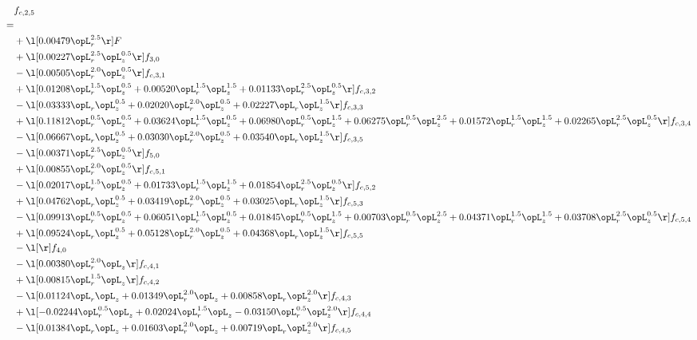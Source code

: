 \begin{alignat}{2} 
\label{eq:f_25_2} 
& f_{c,2,5} \nonumber \\ 
 = \\ 
& + \l[  0.00479 \opL_r^{2.5}  \r] F \nonumber \\ 
& + \l[  0.00227 \opL_r^{2.5} \opL_z^{0.5}  \r] f_{3,0} \nonumber \\ 
& - \l[  0.00505 \opL_r^{2.0} \opL_z^{0.5}  \r] f_{c,3,1} \nonumber \\ 
& + \l[  0.01208 \opL_r^{1.5} \opL_z^{0.5} +  0.00520 \opL_r^{1.5} \opL_z^{1.5} +  0.01133 \opL_r^{2.5} \opL_z^{0.5}  \r] f_{c,3,2} \nonumber \\ 
& - \l[  0.03333 \opL_r \opL_z^{0.5} +  0.02020 \opL_r^{2.0} \opL_z^{0.5} +  0.02227 \opL_r \opL_z^{1.5}  \r] f_{c,3,3} \nonumber \\ 
& + \l[  0.11812 \opL_r^{0.5} \opL_z^{0.5} +  0.03624 \opL_r^{1.5} \opL_z^{0.5} +  0.06980 \opL_r^{0.5} \opL_z^{1.5} +  0.06275 \opL_r^{0.5} \opL_z^{2.5} +  0.01572 \opL_r^{1.5} \opL_z^{1.5} +  0.02265 \opL_r^{2.5} \opL_z^{0.5}  \r] f_{c,3,4} \nonumber \\ 
& - \l[  0.06667 \opL_r \opL_z^{0.5} +  0.03030 \opL_r^{2.0} \opL_z^{0.5} +  0.03540 \opL_r \opL_z^{1.5}  \r] f_{c,3,5} \nonumber \\ 
& - \l[  0.00371 \opL_r^{2.5} \opL_z^{0.5}  \r] f_{5,0} \nonumber \\ 
& + \l[  0.00855 \opL_r^{2.0} \opL_z^{0.5}  \r] f_{c,5,1} \nonumber \\ 
& - \l[  0.02017 \opL_r^{1.5} \opL_z^{0.5} +  0.01733 \opL_r^{1.5} \opL_z^{1.5} +  0.01854 \opL_r^{2.5} \opL_z^{0.5}  \r] f_{c,5,2} \nonumber \\ 
& + \l[  0.04762 \opL_r \opL_z^{0.5} +  0.03419 \opL_r^{2.0} \opL_z^{0.5} +  0.03025 \opL_r \opL_z^{1.5}  \r] f_{c,5,3} \nonumber \\ 
& - \l[  0.09913 \opL_r^{0.5} \opL_z^{0.5} +  0.06051 \opL_r^{1.5} \opL_z^{0.5} +  0.01845 \opL_r^{0.5} \opL_z^{1.5} +  0.00703 \opL_r^{0.5} \opL_z^{2.5} +  0.04371 \opL_r^{1.5} \opL_z^{1.5} +  0.03708 \opL_r^{2.5} \opL_z^{0.5}  \r] f_{c,5,4} \nonumber \\ 
& + \l[  0.09524 \opL_r \opL_z^{0.5} +  0.05128 \opL_r^{2.0} \opL_z^{0.5} +  0.04368 \opL_r \opL_z^{1.5}  \r] f_{c,5,5} \nonumber \\ 
& - \l[  \r] f_{4,0} \nonumber \\ 
& - \l[  0.00380 \opL_r^{2.0} \opL_z  \r] f_{c,4,1} \nonumber \\ 
& + \l[  0.00815 \opL_r^{1.5} \opL_z  \r] f_{c,4,2} \nonumber \\ 
& - \l[  0.01124 \opL_r \opL_z +  0.01349 \opL_r^{2.0} \opL_z +  0.00858 \opL_r \opL_z^{2.0}  \r] f_{c,4,3} \nonumber \\ 
& + \l[  -0.02244 \opL_r^{0.5} \opL_z +  0.02024 \opL_r^{1.5} \opL_z   -0.03150 \opL_r^{0.5} \opL_z^{2.0}  \r] f_{c,4,4} \nonumber \\ 
& - \l[  0.01384 \opL_r \opL_z +  0.01603 \opL_r^{2.0} \opL_z +  0.00719 \opL_r \opL_z^{2.0}  \r] f_{c,4,5} \nonumber \\ 
\end{alignat} 


